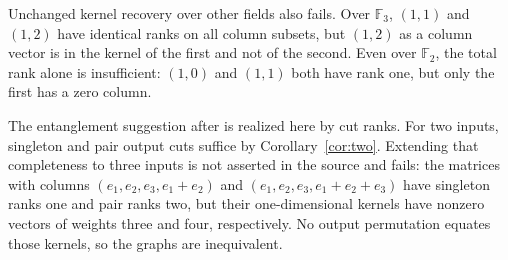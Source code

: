 \documentclass[11pt]{article}
\newcommand{\F}{\mathbb F_2}
\begin{document}
Unchanged kernel recovery over other fields also fails. Over $\mathbb F_3$, $(1,1)$ and
$(1,2)$ have identical ranks on all column subsets, but $(1,2)$ as a
column vector is in the kernel of the first and not of the second.
Even over $\F$, the total rank alone is insufficient: $(1,0)$ and $(1,1)$
both have rank one, but only the first has a zero column.

The entanglement suggestion after \cite[Conjecture 8.3, pp.~23--24]{KL}
is realized here by cut ranks. For two inputs, singleton and pair output
cuts suffice by Corollary~\ref{cor:two}. Extending that completeness to
three inputs is not asserted in the source and fails: the matrices with
columns $(e_1,e_2,e_3,e_1+e_2)$ and $(e_1,e_2,e_3,e_1+e_2+e_3)$ have
singleton ranks one and pair ranks two, but their one-dimensional kernels
have nonzero vectors of weights three and four, respectively. No output
permutation equates those kernels, so the graphs are inequivalent.
\end{document}
